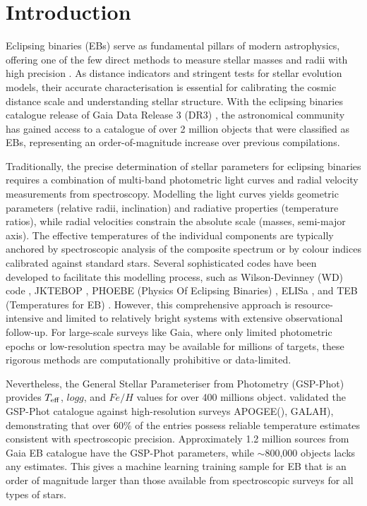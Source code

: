 \documentclass[preprint,12pt,authoryear]{elsarticle}
\begin{document}


\section{Introduction}
\label{sec:intro}

Eclipsing binaries (EBs) serve as fundamental pillars of modern astrophysics, offering one of the few direct methods to measure stellar masses and radii with high precision \citep{Andersen1991, Torres2010}. 
As distance indicators and stringent tests for stellar evolution models, their accurate characterisation is essential for calibrating the cosmic distance scale and understanding stellar structure. 
With the eclipsing binaries catalogue release of Gaia Data Release 3 (DR3) \citep{GaiaDR3_EB}, the astronomical community has gained access to a catalogue of over 2 million objects that were classified as EBs, representing an order-of-magnitude increase over previous compilations.

Traditionally, the precise determination of stellar parameters for eclipsing binaries requires a combination of multi-band photometric light curves and radial velocity measurements from spectroscopy. 
Modelling the light curves yields geometric parameters (relative radii, inclination) and radiative properties (temperature ratios), while radial velocities constrain the absolute scale (masses, semi-major axis). 
The effective temperatures of the individual components are typically anchored by spectroscopic analysis of the composite spectrum or by colour indices calibrated against standard stars. 
Several sophisticated codes have been developed to facilitate this modelling process, such as Wilson-Devinney (WD) code \citep{Wilson1971}, JKTEBOP \citep{Southworth2008}, PHOEBE (Physics Of Eclipsing Binaries) \citep{Prsa2005, Prsa2016}, ELISa \citep{Cokina2021}, and TEB (Temperatures for EB) \citep{Miller2020}. 
However, this comprehensive approach is resource-intensive and limited to relatively bright systems with extensive observational follow-up. 
For large-scale surveys like Gaia, where only limited photometric epochs or low-resolution spectra may be available for millions of targets, these rigorous methods are computationally prohibitive or data-limited.

Nevertheless, the General Stellar Parameteriser from Photometry (GSP-Phot) \citep{GSPphot} provides $T_{\rm eff}$, $logg$, and $Fe/H$ values for over 400 millions object. 
\citet{Avdeeva2024} validated the  GSP-Phot catalogue against high-resolution surveys APOGEE(\citep{Majewski2017}), GALAH\citep{Buder2025}), demonstrating that over 60\% of the entries possess reliable temperature estimates consistent with spectroscopic precision. 
Approximately 1.2 million sources from Gaia EB catalogue have the GSP-Phot parameters, while
$\sim$800,000 objects lacks any estimates. This gives a machine learning training sample for EB that is an order of magnitude larger than those available from spectroscopic surveys for all types of stars. 
\end{document}
